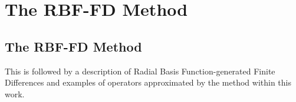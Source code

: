 \documentclass{report}
\begin{document}
{%



%









\part{The RBF-FD Method}

\chapter{The RBF-FD Method}
This is followed by a description of Radial Basis Function-generated Finite Differences and examples of operators approximated by the method within this work.

}
\end{document}
